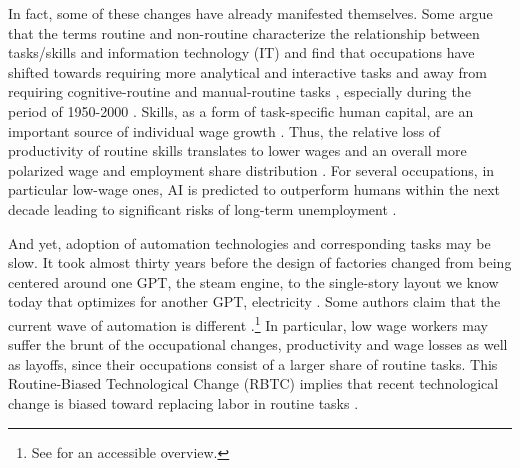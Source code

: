 \documentclass[letterpaper]{article} %
\begin{document}
In fact, some of these changes have already manifested themselves. Some argue that the terms routine and non-routine characterize the relationship between tasks/skills and information technology (IT) and find that occupations have shifted towards requiring more analytical and interactive tasks and away from requiring cognitive-routine and manual-routine tasks \cite{Spitz-Oener2006}, especially during the period of 1950-2000 \cite{atalay2019evolution}. Skills, as a form of task-specific human capital, are an important source of individual wage growth \cite{Gathmann2010}. Thus, the relative loss of productivity of routine skills translates to lower wages and an overall more polarized wage and employment share distribution \cite{AutorDorn2013}. For several occupations, in particular low-wage ones, AI is predicted to outperform humans within the next decade  leading to significant risks of long-term unemployment \cite{grace2018will} \cite{depredicting}.
\par
And yet, adoption of automation technologies and corresponding tasks may be slow. It took almost thirty years before the design of factories changed from being centered around one GPT, the steam engine, to the single-story layout we know today that optimizes for another GPT, electricity \cite{BrynjolfssonMcAfee2014}. Some authors claim that the current wave of automation is different \cite{duckworth2019inferring}.\footnote{See \cite{wajcman2017automation} for an accessible overview.}
In particular, low wage workers may suffer the brunt of the occupational changes, productivity and wage losses as well as layoffs, since their occupations consist of a larger share of routine tasks. This Routine-Biased Technological Change (RBTC) implies that recent technological change is biased toward replacing labor in routine tasks \cite{GoosManningSalomons2014}. 
\end{document}
